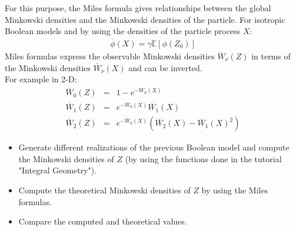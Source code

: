 For this purpose, the Miles formula gives relationships between the global Minkowski densities and the Minkowski densities of the particle.
For isotropic Boolean models and by using the densities of the particle process $X$:
\begin{eqnarray}
\overline{\phi}(X)=\gamma\mathbb{E}[\phi(Z_0)]
\end{eqnarray}
Miles formulas express the observable Minkowski densities $\overline{W}_{\nu}(Z)$ in terms of the Minkowski densities $\overline{W}_{\nu}(X)$ and can be inverted.\\
For example in 2-D: \vspace*{-8pt}
\begin{eqnarray}
\overline{W}_0(Z)&=&1-e^{-\overline{W}_0(X)}\\
\overline{W}_1(Z)&=&e^{-\overline{W}_0(X)}\overline{W}_1(X)\label{eq:miles2}\\
\overline{W}_2(Z)&=&e^{-\overline{W}_0(X)}\left(\overline{W}_2(X)-\overline{W}_1(X)^2\right)\label{eq:miles3}
\end{eqnarray}
\vspace*{-8pt}
\begin{qbox}
\begin{itemize}
\item Generate different realizations of the previous Boolean model and compute the Minkowski densities of $Z$ (by using the functions done in the tutorial "Integral Geometry").
\item Compute the theoretical Minkowski densities of $Z$ by using the Miles formulas.
\item Compare the computed and theoretical values. 
\end{itemize}
\end{qbox}
